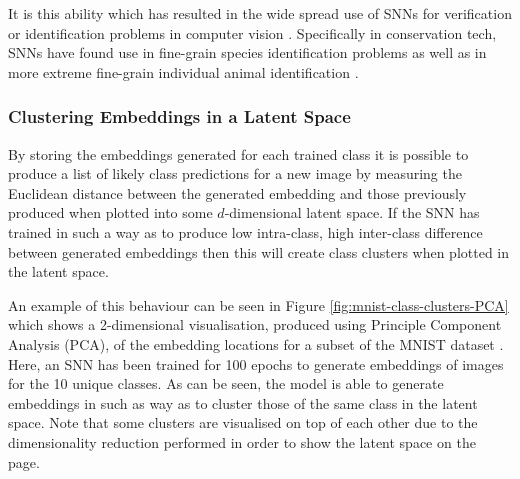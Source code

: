 It is this ability which has resulted in the wide spread use of SNNs for verification or identification problems in computer vision \cite{dey_signet_2017, wang_discriminative_2020}. Specifically in conservation tech, SNNs have found use in fine-grain species identification problems \cite{vetrova_hidden_2018, araujo_two-view_2022} as well as in more extreme fine-grain individual animal identification \cite{clapham_automated_2020}. 

\subsubsection{Clustering Embeddings in a Latent Space}\label{ch:ID,sec:deciding,sub:SNN,subsub:ClusteringEmbeddings}

By storing the embeddings generated for each trained class it is possible to produce a list of likely class predictions for a new image by measuring the Euclidean distance between the generated embedding and those previously produced when plotted into some $d$-dimensional latent space. If the SNN has trained in such a way as to produce low intra-class, high inter-class difference between generated embeddings then this will create class clusters when plotted in the latent space. 

An example of this behaviour can be seen in Figure \ref{fig:mnist-class-clusters-PCA} which shows a 2-dimensional visualisation, produced using Principle Component Analysis (PCA), of the embedding locations for a subset of the MNIST dataset \cite{lecun_gradient-based_1998}. Here, an SNN has been trained for 100 epochs to generate embeddings of images for the 10 unique classes. As can be seen, the model is able to generate embeddings in such as way as to cluster those of the same class in the latent space. Note that some clusters are visualised on top of each other due to the dimensionality reduction performed in order to show the latent space on the page. 

